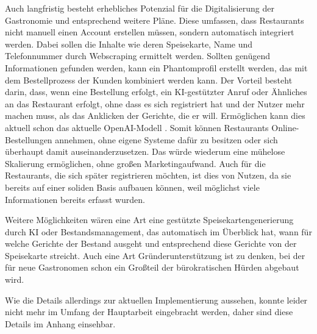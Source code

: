 Auch langfristig besteht erhebliches Potenzial für die Digitalisierung der Gastronomie und entsprechend weitere Pläne. Diese umfassen, dass Restaurants nicht manuell einen Account erstellen müssen, sondern automatisch integriert werden. Dabei sollen die Inhalte wie deren Speisekarte, Name und Telefonnummer durch Webscraping ermittelt werden. Sollten genügend Informationen gefunden werden, kann ein Phantomprofil erstellt werden, das mit dem Bestellprozess der Kunden kombiniert werden kann. Der Vorteil besteht darin, dass, wenn eine Bestellung erfolgt, ein \acs{KI}-gestützter Anruf oder Ähnliches an das Restaurant erfolgt, ohne dass es sich registriert hat und der Nutzer mehr machen muss, als das Anklicken der Gerichte, die er will. Ermöglichen kann dies aktuell schon das aktuelle OpenAI-Modell \citep[vgl.][]{openai_introducing_2024}. Somit können Restaurants Online-Bestellungen annehmen, ohne eigene Systeme dafür zu besitzen oder sich überhaupt damit auseinanderzusetzen. Das würde wiederum eine mühelose Skalierung ermöglichen, ohne großen Marketingaufwand. Auch für die Restaurants, die sich später registrieren möchten, ist dies von Nutzen, da sie bereits auf einer soliden Basis aufbauen können, weil möglichst viele Informationen bereits erfasst wurden.

Weitere Möglichkeiten wären eine Art eine gestützte Speisekartengenerierung durch \acs{KI} oder Bestandsmanagement, das automatisch im Überblick hat, wann für welche Gerichte der Bestand ausgeht und entsprechend diese Gerichte von der Speisekarte streicht. Auch eine Art Gründerunterstützung ist zu denken, bei der für neue Gastronomen schon ein Großteil der bürokratischen Hürden abgebaut wird.

Wie die Details allerdings zur aktuellen Implementierung aussehen, konnte leider nicht mehr im Umfang der Hauptarbeit eingebracht werden, daher sind diese Details im Anhang einsehbar.